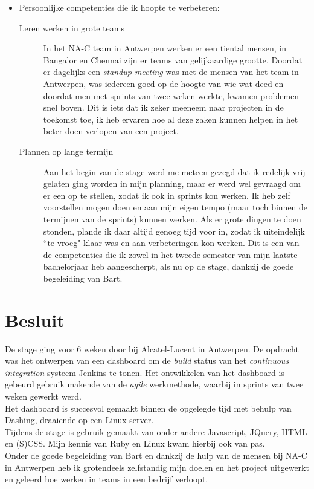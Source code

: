 \documentclass[10pt,a4paper]{article}
\begin{document}
\begin{itemize}
\begin{description}
\end{description}
\item Persoonlijke competenties die ik hoopte te verbeteren:
\begin{description}
\item[Leren werken in grote teams] In het NA-C team in Antwerpen werken er een tiental mensen, in Bangalor en Chennai zijn er teams van gelijkaardige grootte. Doordat er dagelijks een \textit{standup meeting} was met de mensen van het team in Antwerpen, was iedereen goed op de hoogte van wie wat deed en doordat men met sprints van twee weken werkte, kwamen problemen snel boven. Dit is iets dat ik zeker meeneem naar projecten in de toekomst toe, ik heb ervaren hoe al deze zaken kunnen helpen in het beter doen verlopen van een project.
\item[Plannen op lange termijn] Aan het begin van de stage werd me meteen gezegd dat ik redelijk vrij gelaten ging worden in mijn planning, maar er werd wel gevraagd om er een op te stellen, zodat ik ook in sprints kon werken. Ik heb zelf voorstellen mogen doen en aan mijn eigen tempo (maar toch binnen de termijnen van de sprints) kunnen werken. Als er grote dingen te doen stonden, plande ik daar altijd genoeg tijd voor in, zodat ik uiteindelijk ``te vroeg" klaar was en aan verbeteringen kon werken. Dit is een van de competenties die ik zowel in het tweede semester van mijn laatste bachelorjaar heb aangescherpt, als nu op de stage, dankzij de goede begeleiding van Bart.  
\end{description}
\end{itemize}

\section{Besluit}
\label{besluit}
De stage ging voor 6 weken door bij Alcatel-Lucent in Antwerpen. De opdracht was het ontwerpen van een dashboard om de \textit{build} status van het \textit{continuous integration} systeem Jenkins te tonen. Het ontwikkelen van het dashboard is gebeurd gebruik makende van de \textit{agile} werkmethode, waarbij in sprints van twee weken gewerkt werd.\\
Het dashboard is succesvol gemaakt binnen de opgelegde tijd met behulp van Dashing, draaiende op een Linux server.\\
Tijdens de stage is gebruik gemaakt van onder andere Javascript, JQuery, HTML en (S)CSS. Mijn kennis van Ruby en Linux kwam hierbij ook van pas.\\
Onder de goede begeleiding van Bart en dankzij de hulp van de mensen bij NA-C in Antwerpen heb ik grotendeels zelfstandig mijn doelen en het project uitgewerkt en geleerd hoe werken in teams in een bedrijf verloopt.
\end{document}
